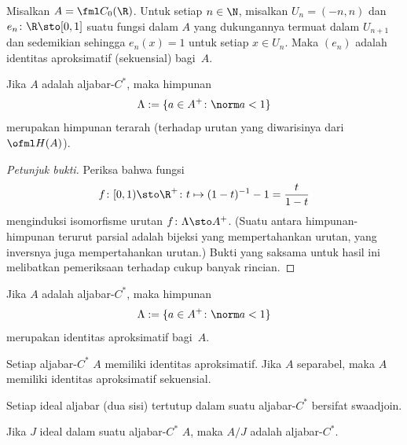 \begin{exam} Misalkan $A = \fml C_0(\R)$. Untuk setiap $n \in \N$, misalkan $U_n = (-n,n)$ dan
$e_n\colon \R \sto [0,1]$ suatu fungsi dalam $A$ yang dukungannya termuat dalam $U_{n+1}$
dan sedemikian sehingga $e_n(x) = 1$ untuk setiap $x \in U_n$. Maka $(e_n)$ adalah identitas
aproksimatif (sekuensial) bagi~$A$.
\end{exam}

\begin{prop} Jika $A$ adalah aljabar-$C^*$, maka himpunan
   \[ \Lambda := \{a \in A^+\colon \norm a < 1\} \]
merupakan himpunan terarah (terhadap urutan yang diwarisinya dari $\ofml H(A)$).
\end{prop}

\begin{proof}[\emph{Petunjuk bukti}] Periksa bahwa fungsi
  \[ f\colon [0,1) \sto \R^+\colon t \mapsto (1 - t)^{-1} - 1 = \frac t{1 - t} \]
menginduksi isomorfisme urutan $f\colon \Lambda \sto A^+$. (Suatu
 antara himpunan-himpunan terurut parsial adalah bijeksi yang mempertahankan urutan,
yang inversnya juga mempertahankan urutan.) Bukti yang saksama untuk hasil ini melibatkan pemeriksaan
terhadap cukup banyak rincian. \ns
\end{proof}

\begin{prop} Jika $A$ adalah aljabar-$C^*$, maka himpunan
  \[ \Lambda := \{a \in A^+\colon \norm a < 1\} \]
merupakan identitas aproksimatif bagi~$A$.
\end{prop}

\begin{cor}\label{00190161} Setiap aljabar-$C^*$ $A$ memiliki identitas aproksimatif.
Jika $A$ separabel, maka $A$ memiliki identitas aproksimatif sekuensial.
\end{cor}

\begin{prop}\label{0019017} Setiap ideal aljabar (dua sisi) tertutup dalam suatu aljabar-$C^*$
bersifat swaadjoin.
\end{prop}

\begin{prop}\label{001902} Jika $J$ ideal dalam suatu aljabar-$C^*$ $A$, maka
$A/J$ adalah aljabar-$C^*$.
\end{prop}

